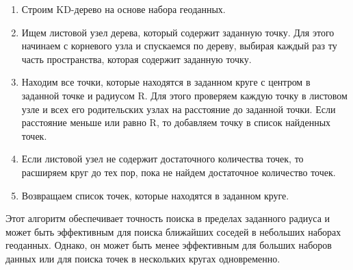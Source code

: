 \begin{enumerate}
    \item Строим KD-дерево на основе набора геоданных.
    \item Ищем листовой узел дерева, который содержит заданную точку. Для этого начинаем с корневого узла и спускаемся по дереву, выбирая каждый раз ту часть пространства, которая содержит заданную точку.
    \item Находим все точки, которые находятся в заданном круге с центром в заданной точке и радиусом R. Для этого проверяем каждую точку в листовом узле и всех его родительских узлах на расстояние до заданной точки. Если расстояние меньше или равно R, то добавляем точку в список найденных точек.
    \item Если листовой узел не содержит достаточного количества точек, то расширяем круг до тех пор, пока не найдем достаточное количество точек.
    \item Возвращаем список точек, которые находятся в заданном круге.
\end{enumerate}

Этот алгоритм обеспечивает точность поиска в пределах заданного радиуса и может быть эффективным для поиска ближайших соседей в небольших наборах геоданных. Однако, он может быть менее эффективным для больших наборов данных или для поиска точек в нескольких кругах одновременно.

